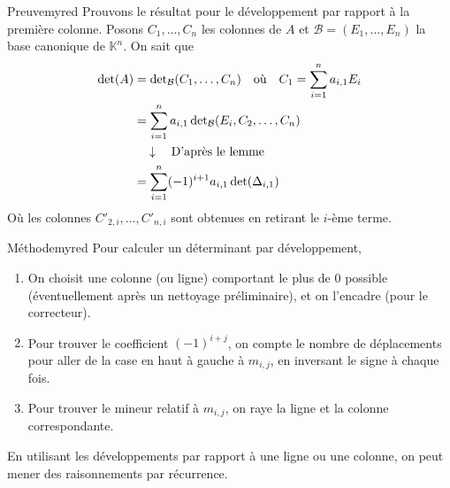     \begin{demo}{Preuve}{myred}
        Prouvons le résultat pour le développement par rapport à la première colonne. Posons $C_1,\ldots,C_n$ les colonnes de $A$ et $\mathcal{B} = (E_1,\ldots,E_n)$ la base canonique de $\mathbb{K}^n$. On sait que 
        \begin{align*}
            \operatorname{det}(A) 
            &= \operatorname{det}_{\mathcal{B}}(C_1,\ldots,C_n) \quad \text{où} \quad C_1 = \sum_{i=1}^n a_{i,1} E_i \\
            &= \sum_{i=1}^n a_{i,1} \operatorname{det}_{\mathcal{B}}(E_{i}, C_2,\ldots,C_n) \\
            & \quad \downarrow \quad \text{D’après le lemme} \\
            &= \sum_{i=1}^n (-1)^{i+1} a_{i,1} \operatorname{det}(\Delta_{i,1})
        \end{align*}
        Où les colonnes $C'_{2,i}, \ldots, C'_{n,i}$ sont obtenues en retirant le $i$-ème terme.
    \end{demo}

    \begin{omed}{Méthode}{myred}
        Pour calculer un déterminant par développement,
        \begin{enumerate}
            \item On choisit une colonne (ou ligne) comportant le plus de 0 possible (éventuellement après un nettoyage préliminaire), et on l’encadre (pour le correcteur).
            \item Pour trouver le coefficient $(-1)^{i+j}$, on compte le nombre de déplacements pour aller de la case en haut à gauche à $m_{i,j}$, en inversant le signe à chaque fois.
            \item Pour trouver le mineur relatif à $m_{i,j}$, on raye la ligne et la colonne correspondante.
        \end{enumerate}

        En utilisant les développements par rapport à une ligne ou une colonne, on peut mener des raisonnements par récurrence.
    \end{omed}

